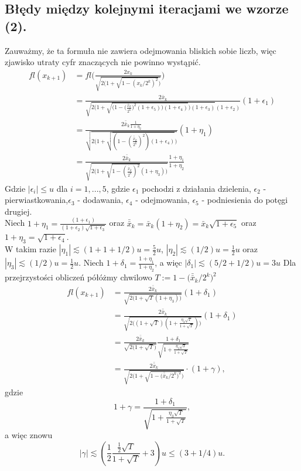 \documentclass[10pt,wide]{mwart}
\theoremstyle{definition}
\begin{document}
\subsection{Błędy między kolejnymi iteracjami we wzorze (2).}
Zauważmy, że ta formuła nie zawiera odejmowania bliskich sobie liczb, więc zjawisko utraty cyfr znaczących nie powinno wystąpić.
\begin{equation*}
\begin{split}
fl(x_{k+1}) & = fl\Bigg(\frac{2x_k}{\sqrt{2\big(1 + \sqrt{1 - (x_k/2^k)^2}\big)}}\Bigg) \\
& = \frac{2\bar{x}_k}{\sqrt{2\Bigg(1+\sqrt{\Big(1-\big(\frac{\bar{x}_k}{2^k}\big)^2(1+\epsilon_5)\Big)(1+\epsilon_4)}\Bigg)(1+\epsilon_3)}(1+\epsilon_2)}(1+\epsilon_1) \\
& = \frac{2\bar{\bar{x}}_k\frac{1}{1 + \eta_2}}{\sqrt{2\bigg(1+\sqrt{(1-(\frac{\bar{\bar{x}}_k}{2^k})^2)(1+\epsilon_4)}\bigg)}}(1+\eta_1)\\
& = \frac{2\bar{\bar{x}}_k}{\sqrt{2\bigg(1+\sqrt{1-(\frac{\bar{\bar{x}}_k}{2^k})^2}(1+\eta_3)\bigg)}}\frac{1+\eta_1}{1+\eta_2}
\end{split}
\end{equation*}
Gdzie \(|\epsilon_i| \leq u \) dla \(i = 1,...,5\), gdzie \(\epsilon_1\) pochodzi z działania dzielenia,
\(\epsilon_2\) - pierwiastkowania,\(\epsilon_{3}\) - dodawania, \(\epsilon_{4}\) - odejmowania,
\(\epsilon_5\) - podniesienia do potęgi drugiej.
\\
Niech \( 1 + \eta_1 = \frac{(1+\epsilon_1)}{(1+\epsilon_2)\sqrt{1+\epsilon_3}} \)
oraz \(\bar{\bar{x}}_k = \bar{x}_k(1+\eta_2) = \bar{x}_k\sqrt{1+\epsilon_5}\)
oraz \(1 + \eta_3 = \sqrt{1 + \epsilon_4}\).
\\
W takim razie \(|\eta_1| \lesssim (1 + 1 + 1/2)u = \frac{5}{2}u\), \(|\eta_2| \lesssim (1/2)u = \frac{1}{2}u\) oraz \(|\eta_3| \lesssim (1/2)u = \frac{1}{2}u\).
Niech \( 1 + \delta_1 = \frac{1+\eta_1}{1+\eta_2}\), a więc \(|\delta_1| \lesssim (5/2 + 1/2)u = 3u\)
Dla przejrzystości obliczeń półóżmy chwilowo \(T := 1 - \Big(\bar{\bar{x}}_k/2^k\Big)^2 \)
\begin{equation*}
\begin{split}
  fl(x_{k+1}) & = \frac{2\bar{\bar{x}}_k}{\sqrt{2\bigg(1+\sqrt{T}(1+\eta_3)\bigg)}}(1+\delta_1) \\
  & = \frac{2\bar{\bar{x}}_k}{\sqrt{2\bigg((1+\sqrt{T})(1+\frac{\eta_3\sqrt{T}}{1 + \sqrt{T}})\bigg)}}(1+\delta_1) \\
  & = \frac{2\bar{\bar{x}}_k}{\sqrt{2\big(1+\sqrt{T}\big)}}\frac{1+\delta_1}{\sqrt{1+\frac{\eta_3\sqrt{T}}{1 + \sqrt{T}}}} \\
  & = \frac{2\bar{\bar{x}}_k}{\sqrt{2\big(1+\sqrt{1 - \Big(\bar{\bar{x}}_k/2^k\Big)^2}\big)}} \cdot (1 + \gamma),
\end{split}
\end{equation*}
gdzie $$ 1 + \gamma = \frac{1+\delta_1}{\sqrt{1+\frac{\eta_3\sqrt{T}}{1 + \sqrt{T}}}}, $$ a więc znowu $$|\gamma| \lesssim (\frac{1}{2}\frac{\frac{1}{2}\sqrt{T}}{1 + \sqrt{T}} + 3)u \leq (3 + 1/4)u.$$
\end{document}
